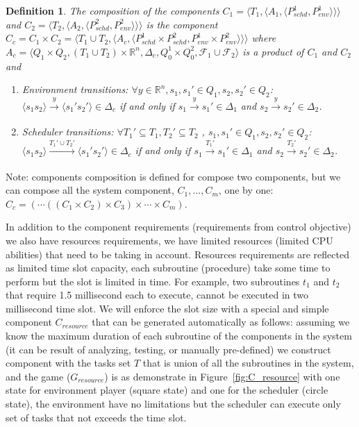\documentclass[ twoside, 12pt ]{article}
\newcommand\R{{\mathbb R}}
\newtheorem{dfn}{Definition} %
\begin{document}
\begin{dfn}
    The composition of the components $C_1=\langle T_1, \langle A_1, \langle P_{schd}^1, P_{env}^1\rangle\rangle\rangle$ and $C_2=\langle T_2, \langle A_2, \langle P_{schd}^2, P_{env}^2\rangle\rangle\rangle$ is the component $C_c = C_1 \times C_2 = \langle T_1 \cup T_2, \langle A_c, \langle P_{schd}^1 \times P_{schd}^2, P_{env}^1 \times P_{env}^2 \rangle\rangle\rangle$ where $A_c= \langle Q_1 \times Q_2,(T_1 \cup T_2) \times \R^n,\Delta_c,Q_0^1 \times Q_0^2,\mathcal{F}_1 \cup \mathcal{F}_2 \rangle$ is a product of $C_1$ and $C_2$ and 
    \begin{enumerate}
        \item Environment transitions: $\forall y \in \R^n, s_1 , s_1' \in Q_1, s_2 , s_2' \in Q_2$:
        $\langle s_{1} s_2 \rangle \xrightarrow[]{y} \langle s_{1}' s_2' \rangle \in \Delta_c$
        if and only if 
        $s_{1} \xrightarrow[]{y} s_{1}' \in \Delta_1$ and $s_{2} \xrightarrow[]{y} s_{2}' \in \Delta_2$.
        \item Scheduler transitions: $\forall T_1' \subseteq T_1,T_2' \subseteq T_2$ , $s_1 , s_1' \in Q_1, s_2 , s_2' \in Q_2$:
        $\langle s_{1} s_2 \rangle \xrightarrow[]{T_1' \cup T_2'} \langle s_{1}' s_2' \rangle \in \Delta_c$
        if and only if         
        $s_{1} \xrightarrow[]{T_1'} s_{1}' \in \Delta_1$ and $s_{2} \xrightarrow[]{T_2'} s_{2}' \in \Delta_2$.
    \end{enumerate}
\end{dfn}

Note: components composition is defined for compose two components, but we can compose all the system component, $C_1 , ... , C_m$, one by one: $C_c = (\cdots((C_1 \times C_2) \times C_3 ) \times \cdots \times C_m)$.

In addition to the component requirements (requirements from control objective) we also have resources requirements, we have limited resources (limited CPU abilities) that need to be taking in account.
Resources requirements are reflected as limited time slot capacity, each subroutine (procedure) take some time to perform but the slot is limited in time.
For example, two subroutines $t_1$ and $t_2$ that require 1.5 millisecond each to execute, cannot be executed in two millisecond time slot.
We will enforce the slot size with a special and simple component $C_{resource}$ that can be generated automatically as follows:
assuming we know the maximum duration of each subroutine of the components in the system (it can be result of analyzing, testing, or manually pre-defined) we construct component with the tasks set $T$ that is union of all the subroutines in the system, and the game ($G_{resource}$) is as demonstrate in Figure~\ref{fig:C_resource} with one state for environment player (square state) and one for the scheduler (circle state), the environment have no limitations but the scheduler can execute only set of tasks that not exceeds the time slot.
\end{document}
